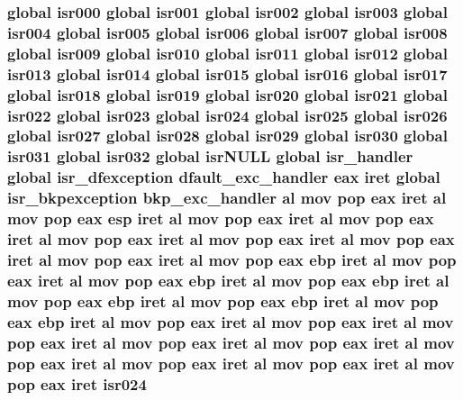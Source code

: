 \subsubsection[{\texorpdfstring{isr024}{isr024}}]{\setlength{\rightskip}{0pt plus 5cm}global {\bf isr000} global {\bf isr001} global {\bf isr002} global {\bf isr003} global {\bf isr004} global {\bf isr005} global {\bf isr006} global {\bf isr007} global {\bf isr008} global {\bf isr009} global {\bf isr010} global {\bf isr011} global {\bf isr012} global {\bf isr013} global {\bf isr014} global {\bf isr015} global {\bf isr016} global {\bf isr017} global {\bf isr018} global {\bf isr019} global {\bf isr020} global {\bf isr021} global {\bf isr022} global {\bf isr023} global isr024 global {\bf isr025} global {\bf isr026} global {\bf isr027} global {\bf isr028} global {\bf isr029} global {\bf isr030} global {\bf isr031} global isr032 global isr\+N\+U\+LL global isr\+\_\+handler global {\bf isr\+\_\+dfexception} {\bf dfault\+\_\+exc\+\_\+handler} eax iret global {\bf isr\+\_\+bkpexception} {\bf bkp\+\_\+exc\+\_\+handler} {\bf al} {\bf mov} pop eax iret {\bf al} {\bf mov} pop eax esp iret {\bf al} {\bf mov} pop eax iret {\bf al} {\bf mov} pop eax iret {\bf al} {\bf mov} pop eax iret {\bf al} {\bf mov} pop eax iret {\bf al} {\bf mov} pop eax iret {\bf al} {\bf mov} pop eax iret {\bf al} {\bf mov} pop eax ebp iret {\bf al} {\bf mov} pop eax iret {\bf al} {\bf mov} pop eax ebp iret {\bf al} {\bf mov} pop eax ebp iret {\bf al} {\bf mov} pop eax ebp iret {\bf al} {\bf mov} pop eax ebp iret {\bf al} {\bf mov} pop eax ebp iret {\bf al} {\bf mov} pop eax iret {\bf al} {\bf mov} pop eax iret {\bf al} {\bf mov} pop eax iret {\bf al} {\bf mov} pop eax iret {\bf al} {\bf mov} pop eax iret {\bf al} {\bf mov} pop eax iret {\bf al} {\bf mov} pop eax iret {\bf al} {\bf mov} pop eax iret {\bf al} {\bf mov} pop eax iret isr024}\hypertarget{isrs_8as_a0d82e4722bcca7512dcd8146690a3995}{}\label{isrs_8as_a0d82e4722bcca7512dcd8146690a3995}
